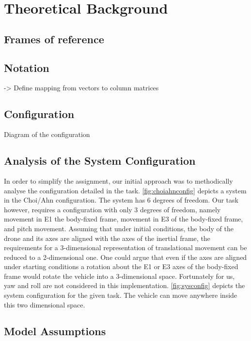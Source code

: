 \section{Theoretical Background}



\subsection{Frames of reference}

\subsection{Notation} %
-> Define mapping from vectors to column matrices
\subsection{Configuration}
Diagram of the configuration

\subsection{Analysis of the System Configuration}\label{s:analysis}
\label{fig:sysconfig}
\label{fig:choiahnconfig}
In order to simplify the assignment, our initial approach was to methodically analyse the configuration detailed in the task.
\cref{fig:choiahnconfig} depicts a system in the Choi/Ahn configuration. The system has 6 degrees of freedom. Our task however, requires a configuration with only 3 degrees of freedom, namely movement in E1 the body-fixed frame, movement in E3 of the body-fixed frame, and pitch movement.
Assuming that under initial conditions, the body of the drone and its axes are aligned with the axes of the inertial frame, the requirements for a 3-dimensional representation of translational movement can be reduced to a 2-dimensional one. One could argue that even if the axes are aligned under starting conditions a rotation about the E1 or E3 axes of the body-fixed frame would rotate the vehicle into a 3-dimensional space. Fortunately for us, yaw and roll are not considered in this implementation.
\cref{fig:sysconfig} depicts the system configuration for the given task. The vehicle can move anywhere inside this two dimensional space.

\subsection{Model Assumptions}\label{s:modassumptions}

